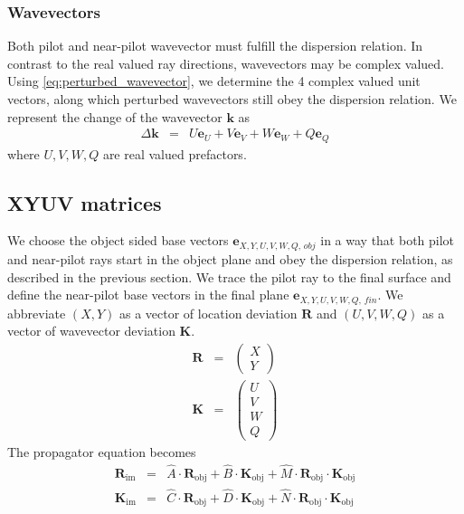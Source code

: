 \documentclass[12pt,a4paper,twoside,openright,BCOR10mm,headsepline,titlepage,abstracton,chapterprefix,final]{scrreprt}
\newcommand\Vector[1]{{\mathbf{#1}}}
\newcommand\wavenumber{k}
\newcommand\Wavevector{\Vector{\wavenumber}}
\newcommand\im{\textrm{im}}
\newcommand\obj{\textrm{obj}}
\begin{document}
\subsubsection{Wavevectors}
Both pilot and near-pilot wavevector must fulfill the dispersion relation. 
In contrast to the real valued ray directions, wavevectors may be complex valued.
Using \eqref{eq:perturbed_wavevector}, we determine the 4 complex valued unit vectors,
along which perturbed wavevectors still obey the dispersion relation.
We represent the change of the wavevector $\Wavevector$ as
\begin{eqnarray}
 \Delta \Wavevector &=& U \Vector{e}_U + V \Vector{e}_V + W \Vector{e}_W + Q \Vector{e}_Q
\end{eqnarray}
where $U,V,W,Q$ are real valued prefactors.

\subsection{XYUV matrices}
We choose the object sided base vectors 
$\Vector{e}_{X,Y,U,V,W,Q,\,obj}$ 
in a way that both pilot and near-pilot rays start in the object plane and obey the dispersion relation, 
as described in the previous section.
We trace the pilot ray to the final surface 
and define the near-pilot base vectors in the final plane
$\Vector{e}_{X,Y,U,V,W,Q,\,fin}$.
We abbreviate $(X,Y)$ as a vector of location deviation $\Vector{R}$
and $(U,V,W,Q)$ as a vector of wavevector deviation $\Vector{K}$.
\begin{eqnarray}
\Vector{R} &=&
 \begin{pmatrix}
  X \\ Y
 \end{pmatrix}
 \\
 \Vector{K} &=&
 \begin{pmatrix}
  U \\ V \\ W \\ Q 
 \end{pmatrix}
\end{eqnarray}
The propagator equation becomes
\begin{subequations}
\begin{eqnarray}
 \Vector{R}_\im &=& \hat{A} \cdot \Vector{R}_\obj + \hat{B} \cdot \Vector{K}_\obj + \hat{M} \cdot \Vector{R}_\obj \cdot \Vector{K}_\obj\label{eq:xyuv_imaging_equation}\\
 \Vector{K}_\im &=& \hat{C} \cdot \Vector{R}_\obj + \hat{D} \cdot \Vector{K}_\obj + \hat{N} \cdot \Vector{R}_\obj \cdot \Vector{K}_\obj
\end{eqnarray}
\end{subequations}
\end{document}

